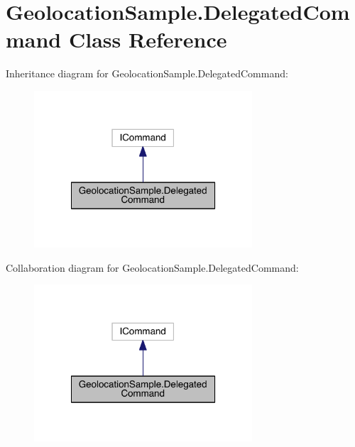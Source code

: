 \hypertarget{class_geolocation_sample_1_1_delegated_command}{\section{Geolocation\+Sample.\+Delegated\+Command Class Reference}
\label{class_geolocation_sample_1_1_delegated_command}
}


Inheritance diagram for Geolocation\+Sample.\+Delegated\+Command\+:
\nopagebreak
\begin{figure}[H]
\begin{center}
\leavevmode
\includegraphics[width=230pt]{class_geolocation_sample_1_1_delegated_command__inherit__graph}
\end{center}
\end{figure}


Collaboration diagram for Geolocation\+Sample.\+Delegated\+Command\+:
\nopagebreak
\begin{figure}[H]
\begin{center}
\leavevmode
\includegraphics[width=230pt]{class_geolocation_sample_1_1_delegated_command__coll__graph}
\end{center}
\end{figure}

